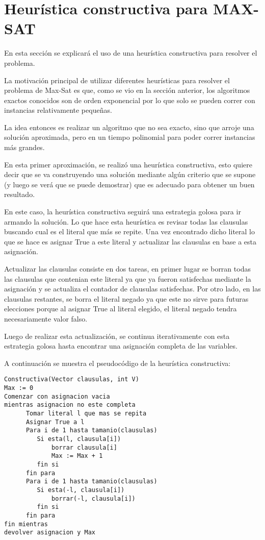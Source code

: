 \documentclass[a4paper,10pt]{article}
\begin{document}
\section*{Heur\'istica constructiva para MAX-SAT}
En esta secci\'on se explicar\'a el uso de una heur\'istica constructiva para resolver el problema.

La motivaci\'on principal de utilizar diferentes heur\'isticas para resolver el problema de Max-Sat es que, como se vio en la secci\'on anterior, los algoritmos exactos conocidos son de orden exponencial por lo que solo se pueden correr con instancias relativamente peque\~{n}as.

La idea entonces es realizar un algoritmo que no sea exacto, sino que arroje una soluci\'on aproximada, pero en un tiempo polinomial para poder correr instancias m\'as grandes.

En esta primer aproximaci\'on, se realiz\'o una heur\'istica constructiva, esto quiere decir que se va construyendo una soluci\'on mediante alg\'un criterio que se supone (y luego se ver\'a que se puede demostrar) que es adecuado para obtener un buen resultado.

En este caso, la heur\'istica constructiva seguir\'a una estrategia golosa para ir armando la soluci\'on. Lo que hace esta heur\'istica es revisar todas las clausulas buscando cual es el literal que m\'as se repite. Una vez encontrado dicho literal lo que se hace es asignar True a este literal y actualizar las clausulas en base a esta asignaci\'on.

Actualizar las clausulas consiste en dos tareas, en primer lugar se borran todas las clausulas que contenian este literal ya que ya fueron satisfechas mediante la asignaci\'on y se actualiza el contador de clausulas satisfechas. Por otro lado, en las clausulas restantes, se borra el literal negado ya que este no sirve para futuras elecciones porque al asignar True al literal elegido, el literal negado tendra necesariamente valor falso.

Luego de realizar esta actualizaci\'on, se continua iterativamente con esta estrategia golosa hasta encontrar una asignaci\'on completa de las variables.

A continuaci\'on se muestra el pseudoc\'odigo de la heur\'istica constructiva:

\begin{verbatim}
Constructiva(Vector clausulas, int V)
Max := 0
Comenzar con asignacion vacia
mientras asignacion no este completa
      Tomar literal l que mas se repita
      Asignar True a l
      Para i de 1 hasta tamanio(clausulas)
         Si esta(l, clausula[i])
             borrar clausula[i]
             Max := Max + 1
         fin si
      fin para
      Para i de 1 hasta tamanio(clausulas)
         Si esta(-l, clausula[i])
             borrar(-l, clausula[i])
         fin si
      fin para
fin mientras
devolver asignacion y Max
\end{verbatim}
\end{document}
